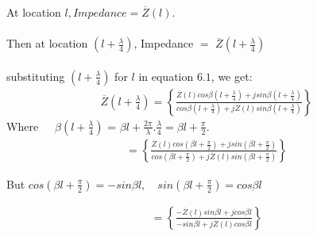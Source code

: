 At location $l , Impedance =\overline{Z}(l).$\\\\
 Then at location ${(l+\frac{\lambda}{4})}$, Impedance  $=$ $\overline{Z}(l+\frac{\lambda}{4})$\\\\
  substituting ${(l+\frac{\lambda}{4})}$ for $l$ in equation $6.1$, we get:
\begin{align*}
\overline{Z}(l+\frac{\lambda}{4}) = \left\lbrace \frac{\overline{Z}(l)cos\beta (l+\frac{\lambda}{4}) + jsin\beta (l+\frac{\lambda}{4})}{cos\beta (l+\frac{\lambda}{4}) + j\overline{Z}(l)sin\beta (l+\frac{\lambda}{4})}\right\rbrace 
\end{align*}
 Where\ \ \  $\beta( l + \frac{\lambda}{4})$ = $\beta l + \frac{2\pi}{\lambda} . \frac{\lambda}{4} = \beta l + \frac{\pi}{2}.$
\begin{align*} 
= \left\lbrace \frac{\overline{Z}(l)cos(\beta l + \frac{\pi}{2}) + jsin(\beta l + \frac{\pi}{2})}{cos (\beta l + \frac{\pi}{2}) + j\overline{Z}(l)sin(\beta l + \frac{\pi}{2})}\right\rbrace
\end{align*}

 But $cos(\beta l + \frac{\pi}{2})= -sin\beta l , \quad sin(\beta l +\frac{\pi}{2})= cos\beta l$
 
 \begin{align*} 
 = \left\lbrace \frac{-\overline{Z}(l)sin\beta l + jcos\beta l}{-sin\beta l + j\overline{Z}(l) cos\beta l}\right\rbrace
 \end{align*}
 
